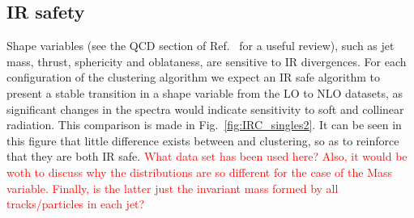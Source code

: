 \subsection{IR safety}
Shape variables (see the QCD section of Ref.~\cite{Altarelli:116932} for a useful review), such as jet mass, thrust, sphericity and oblataness,  are sensitive to IR divergences.
For each configuration of the clustering algorithm we expect an IR safe algorithm to present a stable transition
in a shape variable from the LO to NLO datasets, as significant
changes in the spectra would indicate sensitivity to soft and collinear radiation.
This comparison is made in Fig.~\ref{fig:IRC_singles2}.
It can be seen in this figure that little difference exists between \genkt{} and \spectral{} clustering, so as to reinforce that they are both IR safe.
{\textcolor{red}{What data set has been used here? Also, it would be woth to discuss why the distributions are so different for the case of the Mass variable. Finally, is the latter just the invariant mass formed by all tracks/particles in each jet?}}

